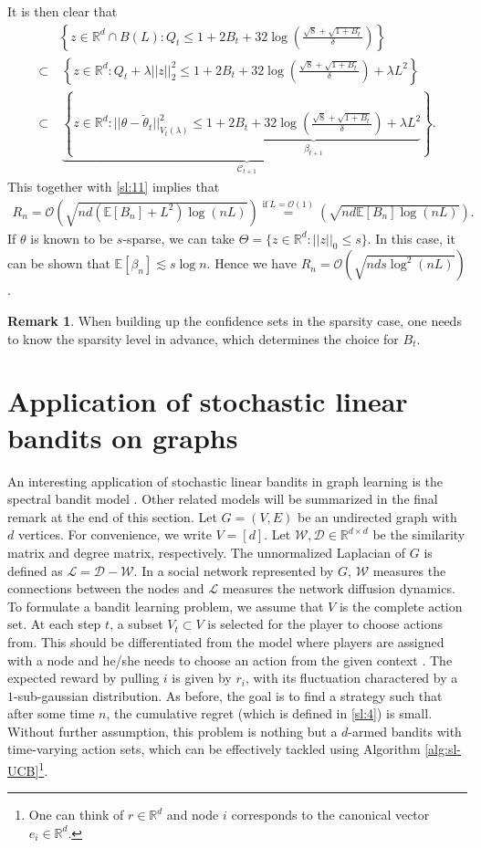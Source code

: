 \documentclass[10pt, openright]{book}
\numberwithin{equation}{section}
\theoremstyle{plain}
\theoremstyle{definition}
\newtheorem{Rem}[Th]{Remark}
\def\R{{\mathbb R}}
\def\E{{\mathbb E}}
\def\R{{\mathbb R}}
\def\t{{\theta}}
\begin{document}
It is then clear that 
\begin{align*}
&\left\{z\in\R^d\cap B(L): Q_t\leq 1+2B_t+32\log\left(\frac{\sqrt{8}+\sqrt{1+B_t}}{\delta}\right) \right\}\\
\subset&\ \left\{z\in\R^d: Q_t +\lambda ||z||_2^2\leq 1+2B_t+32\log\left(\frac{\sqrt{8}+\sqrt{1+B_t}}{\delta}\right) +\lambda L^2\right\}\\
\subset&\ \underbrace{\left\{z\in\R^d: ||\t-\tilde\t_t||^2_{V_t(\lambda)}\leq \underbrace{1+2B_t+32\log\left(\frac{\sqrt{8}+\sqrt{1+B_t}}{\delta}\right)+\lambda L^2}_{\beta_{t+1}} \right\}}_{\mathcal C_{t+1}}. 
\end{align*}
This together with \eqref{sl:11} implies that 
\begin{align*}
R_n = \mathcal O \left(\sqrt{nd(\E[B_n]+L^2)\log(nL)}\right)\stackrel{\text{if}\ L=\mathcal O(1)}{=}\left(\sqrt{nd\E[B_n]\log(nL)}\right).
\end{align*}
If $\t$ is known to be $s$-sparse, we can take $\Theta = \{z\in\R^d: ||z||_0\leq s\}$. In this case, it can be shown that $\E[\beta_n] \lesssim s\log n$. Hence we have $R_n = \mathcal O \left(\sqrt{nds\log^2(nL)}\right)$.
\begin{Rem}
When building up the confidence sets in the sparsity case, one needs to know the sparsity level in advance, which determines the choice for $B_t$. 
\end{Rem} 



\section{Application of stochastic linear bandits on graphs}
An interesting application of stochastic linear bandits in graph learning is the spectral bandit model \cite{valko2014spectral}. 
Other related models will be summarized in the final remark at the end of this section. 
Let $G=(V, E)$ be an undirected graph with $d$ vertices. 
For convenience, we write $V=[d]$. 
Let $\mathcal W, \mathcal D\in\R^{d\times d}$ be the similarity matrix and degree matrix, respectively. 
The unnormalized Laplacian of $G$ is defined as $\mathcal L=\mathcal D-\mathcal W$. 
In a social network represented by $G$, $\mathcal W$ measures the connections between the nodes and $\mathcal L$ measures the network diffusion dynamics. 
To formulate a bandit learning problem, we assume that $V$ is the complete action set.
At each step $t$, a subset $V_t\subset V$ is selected for the player to choose actions from.
This should be differentiated from the model where players are assigned with a node and he/she needs to choose an action from the given context \cite{cesa2013gang}.  
The expected reward by pulling $i$ is given by $r_i$, with its fluctuation charactered by a $1$-sub-gaussian distribution. 
As before, the goal is to find a strategy such that after some time $n$, the cumulative regret (which is defined in \eqref{sl:4}) is small.  
Without further assumption, this problem is nothing but a $d$-armed bandits with time-varying action sets, which can be effectively tackled using Algorithm \ref{alg:sl-UCB}\footnote{One can think of $r\in\R^d$ and node $i$ corresponds to the canonical vector $e_i\in\R^d$. }. 
\end{document}

